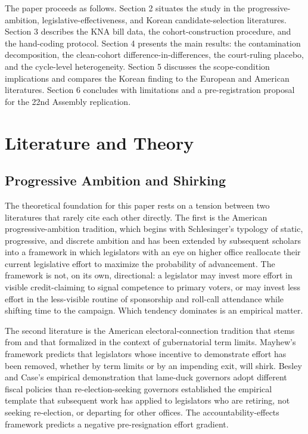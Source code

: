 \documentclass[11pt]{article}
\begin{document}
The paper proceeds as follows. Section 2 situates the study in the progressive-ambition, legislative-effectiveness, and Korean candidate-selection literatures. Section 3 describes the KNA bill data, the cohort-construction procedure, and the hand-coding protocol. Section 4 presents the main results: the contamination decomposition, the clean-cohort difference-in-differences, the court-ruling placebo, and the cycle-level heterogeneity. Section 5 discusses the scope-condition implications and compares the Korean finding to the European and American literatures. Section 6 concludes with limitations and a pre-registration proposal for the 22nd Assembly replication.

\section{Literature and Theory}

\subsection{Progressive Ambition and Shirking}

The theoretical foundation for this paper rests on a tension between two literatures that rarely cite each other directly. The first is the American progressive-ambition tradition, which begins with Schlesinger's \citeyearpar{schlesinger1966} typology of static, progressive, and discrete ambition and has been extended by subsequent scholars into a framework in which legislators with an eye on higher office reallocate their current legislative effort to maximize the probability of advancement. The framework is not, on its own, directional: a legislator may invest more effort in visible credit-claiming to signal competence to primary voters, or may invest less effort in the less-visible routine of sponsorship and roll-call attendance while shifting time to the campaign. Which tendency dominates is an empirical matter.

The second literature is the American electoral-connection tradition that stems from \citet{mayhew1974} and that \citet{besley1995} formalized in the context of gubernatorial term limits. Mayhew's framework predicts that legislators whose incentive to demonstrate effort has been removed, whether by term limits or by an impending exit, will shirk. Besley and Case's \citeyearpar{besley1995} empirical demonstration that lame-duck governors adopt different fiscal policies than re-election-seeking governors established the empirical template that subsequent work has applied to legislators who are retiring, not seeking re-election, or departing for other offices. The accountability-effects framework predicts a negative pre-resignation effort gradient.
\end{document}

